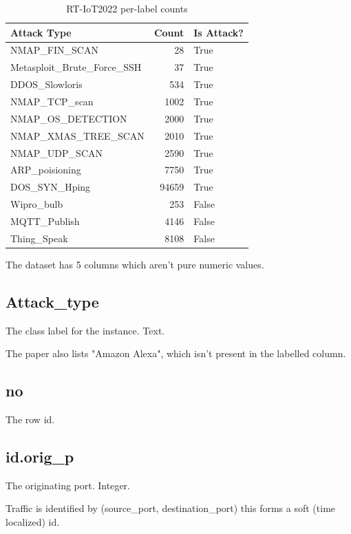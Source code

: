 \documentclass[11pt]{article}
\begin{document}
\begin{table}[H]
	\centering
	\begin{tabular}{ | l | r | l | }
		\hline
		\textbf{Attack Type} & \textbf{Count} & \textbf{Is Attack?} \\
		\hline
		NMAP\_FIN\_SCAN &  28 & True \\
		\hline
		Metasploit\_Brute\_Force\_SSH & 37 & True  \\
		\hline
		DDOS\_Slowloris & 534 & True  \\
		\hline
		NMAP\_TCP\_scan & 1002 & True \\
		\hline
		NMAP\_OS\_DETECTION & 2000 & True \\
		\hline
		NMAP\_XMAS\_TREE\_SCAN & 2010 & True \\
		\hline
		NMAP\_UDP\_SCAN & 2590 & True \\
		\hline
		ARP\_poisioning & 7750 & True \\
		\hline
		DOS\_SYN\_Hping & 94659 & True \\
		\hline
		Wipro\_bulb & 253 & False  \\
		\hline
		MQTT\_Publish & 4146 & False \\
		\hline
		Thing\_Speak & 8108 & False \\
		\hline
	\end{tabular}
\caption{RT-IoT2022 per-label counts}
\end{table}

The dataset has 5 columns which aren't pure numeric values.

\subsection{Attack\_type}

The class label for the instance. Text.

The paper also lists "Amazon Alexa", which isn't present in the labelled column.

\subsection{no}

The row id.

\subsection{id.orig\_p}

The originating port. Integer. 

Traffic is identified by (source\_port, destination\_port) this forms a soft (time localized) id.
\end{document}
